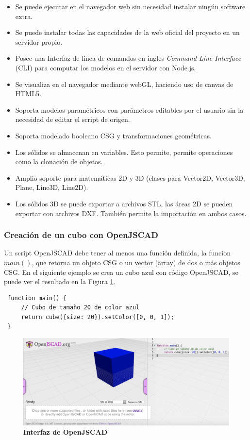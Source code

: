 \begin{itemize}
    \item Se puede ejecutar en el navegador web sin necesidad instalar ningún software extra.
    \item Se puede instalar todas las capacidades de la web oficial del proyecto en un servidor propio.
    \item Posee una Interfaz de linea de comandos en ingles \textit{Command Line Interface} (CLI) para computar los modelos en el servidor con Node.js.
    \item Se visualiza en el navegador mediante webGL, haciendo uso de canvas de HTML5.
    \item Soporta modelos paramétricos con parámetros editables por el usuario sin la necesidad de editar el script de origen.
    \item Soporta modelado booleano CSG y transformaciones geométricas.
    \item Los sólidos se almacenan en variables. Esto permite, permite operaciones como la clonación de objetos.
    \item Amplio soporte para matemáticas 2D y 3D (clases para Vector2D, Vector3D, Plane, Line3D, Line2D).
    \item Los sólidos 3D se puede exportar a archivos STL, las áreas 2D se pueden exportar con archivos DXF. También permite la importación en ambos casos.
\end{itemize}

\subsubsection{Creación de un cubo con OpenJSCAD}

Un script OpenJSCAD debe tener al menos una función definida, la funcion $main()$, que retorna un objeto CSG o un vector (array) de dos o más objetos CSG. En el siguiente ejemplo se crea un cubo azul con código OpenJSCAD, se puede ver el resultado en la Figura \ref{fig:jopen}. 

\begin{verbatim}
 function main() {
     // Cubo de tamaño 20 de color azul
     return cube({size: 20}).setColor([0, 0, 1]);
 }
\end{verbatim}

\begin{figure}[h]
\includegraphics[width=15cm]{Img/WEB/web-jopen.jpg}
\centering
\caption{\textbf{\footnotesize{Interfaz de OpenJSCAD }}}
\label{fig:jopen}
\end{figure}


